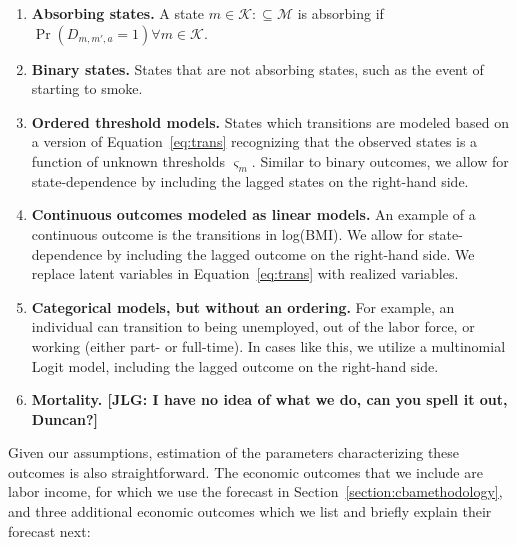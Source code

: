 \begin{enumerate}
\item \textbf{Absorbing states.} A state $m \in \mathcal{K} :\subseteq \mathcal{M}$ is absorbing if $\Pr \left( D_{m,m',a} = 1 \right) \forall m \in \mathcal{K}$.
\item \textbf{Binary states.} States that are not absorbing states, such as the event of starting to smoke.
\item \textbf{Ordered threshold models.} States which transitions are modeled based on a version of Equation~\eqref{eq:trans} recognizing that the observed states is a function of unknown thresholds $\varsigma_m$. Similar to binary outcomes, we allow for state-dependence by including the lagged states on the right-hand side.
\item \textbf{Continuous outcomes modeled as linear models.} An example of a continuous outcome is the
transitions in log(BMI). We allow for state-dependence by including the lagged outcome on the right-hand side. We replace latent variables in Equation~\eqref{eq:trans} with realized variables.
\item \textbf{Categorical models, but without an ordering.} For example, an individual can transition
to being unemployed, out of the labor force, or working (either part- or full-time). In cases like this, we utilize
a multinomial Logit model, including the lagged outcome on the right-hand side.
\item \textbf{Mortality. [JLG: I have no idea of what we do, can you spell it out, Duncan?]}
\end{enumerate}

Given our assumptions, estimation of the parameters characterizing these outcomes is also straightforward. The economic outcomes that we include are labor income, for which we use the forecast in Section~\ref{section:cbamethodology}, and three additional economic outcomes which we list and briefly explain their forecast next:

